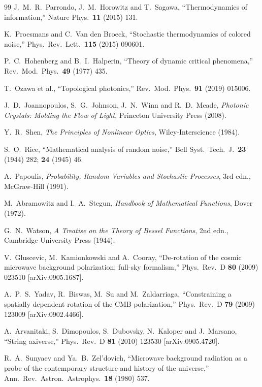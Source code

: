 \documentclass[12pt]{article}
\theoremstyle{definition}
\begin{document}
\begin{thebibliography}{99}
J.~M.~R.~Parrondo, J.~M.~Horowitz and T.~Sagawa,
``Thermodynamics of information,''
Nature Phys.\ \textbf{11} (2015) 131.

K.~Proesmans and C.~Van den Broeck,
``Stochastic thermodynamics of colored noise,''
Phys.\ Rev.\ Lett.\ \textbf{115} (2015) 090601.

P.~C.~Hohenberg and B.~I.~Halperin,
``Theory of dynamic critical phenomena,''
Rev.\ Mod.\ Phys.\ \textbf{49} (1977) 435.

T.~Ozawa et al.,
``Topological photonics,''
Rev.\ Mod.\ Phys.\ \textbf{91} (2019) 015006.

J.~D.~Joannopoulos, S.~G.~Johnson, J.~N.~Winn and R.~D.~Meade,
\textit{Photonic Crystals: Molding the Flow of Light},
Princeton University Press (2008).

Y.~R.~Shen,
\textit{The Principles of Nonlinear Optics},
Wiley-Interscience (1984).

S.~O.~Rice,
``Mathematical analysis of random noise,''
Bell Syst.\ Tech.\ J.\ \textbf{23} (1944) 282; \textbf{24} (1945) 46.

A.~Papoulis,
\textit{Probability, Random Variables and Stochastic Processes},
3rd edn., McGraw-Hill (1991).

M.~Abramowitz and I.~A.~Stegun,
\textit{Handbook of Mathematical Functions},
Dover (1972).

G.~N.~Watson,
\textit{A Treatise on the Theory of Bessel Functions},
2nd edn., Cambridge University Press (1944).

V.~Gluscevic, M.~Kamionkowski and A.~Cooray,
``De-rotation of the cosmic microwave background polarization: full-sky
formalism,''
Phys.\ Rev.\ D \textbf{80} (2009) 023510 [arXiv:0905.1687].

A.~P.~S.~Yadav, R.~Biswas, M.~Su and M.~Zaldarriaga,
``Constraining a spatially dependent rotation of the CMB polarization,''
Phys.\ Rev.\ D \textbf{79} (2009) 123009 [arXiv:0902.4466].

A.~Arvanitaki, S.~Dimopoulos, S.~Dubovsky, N.~Kaloper and J.~Marsano,
``String axiverse,''
Phys.\ Rev.\ D \textbf{81} (2010) 123530 [arXiv:0905.4720].

R.~A.~Sunyaev and Ya.~B.~Zel'dovich,
``Microwave background radiation as a probe of the contemporary structure and
history of the universe,''
Ann.\ Rev.\ Astron.\ Astrophys.\ \textbf{18} (1980) 537.


\end{thebibliography}
\end{document}
